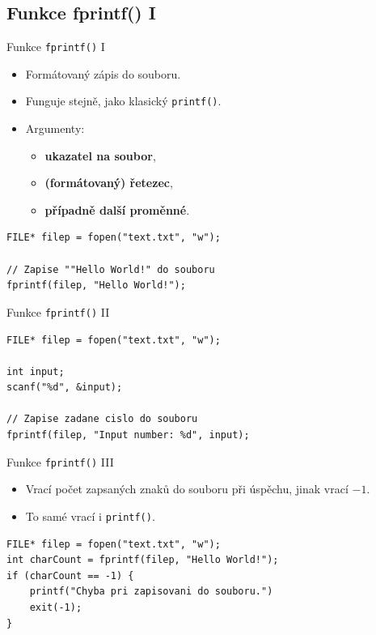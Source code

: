\documentclass[14pt,aspectratio=169]{beamer}
\begin{document}
    \subsection{Funkce fprintf() \textrm{I}}
    \begin{frame}[t,fragile]{Funkce \texttt{fprintf()} \textrm{I}}
        \begin{itemize}
            \item Formátovaný zápis do souboru.
            \item Funguje stejně, jako klasický \texttt{printf()}.
            \item Argumenty:
            \begin{itemize}
                \item \textbf{ukazatel na soubor},
                \item \textbf{(formátovaný) řetezec},
                \item \textbf{případně další proměnné}.
            \end{itemize}
        \end{itemize}
        \begin{lstlisting}
FILE* filep = fopen("text.txt", "w");

// Zapise ""Hello World!" do souboru
fprintf(filep, "Hello World!");
        \end{lstlisting}
    \end{frame}

    \begin{frame}[fragile]{Funkce \texttt{fprintf()} \textrm{II}}
        \begin{lstlisting}
FILE* filep = fopen("text.txt", "w");

int input;
scanf("%d", &input);

// Zapise zadane cislo do souboru
fprintf(filep, "Input number: %d", input);
        \end{lstlisting}
    \end{frame}

    \begin{frame}[t,fragile]{Funkce \texttt{fprintf()} \textrm{III}}
        \begin{itemize}
            \item Vrací počet zapsaných znaků do souboru při úspěchu, jinak vrací $-1$.
            \item To samé vrací i \texttt{printf()}.
        \end{itemize}
        \begin{lstlisting}
FILE* filep = fopen("text.txt", "w");
int charCount = fprintf(filep, "Hello World!");
if (charCount == -1) {
    printf("Chyba pri zapisovani do souboru.")
    exit(-1);
}
        \end{lstlisting}
    \end{frame}
\end{document}
